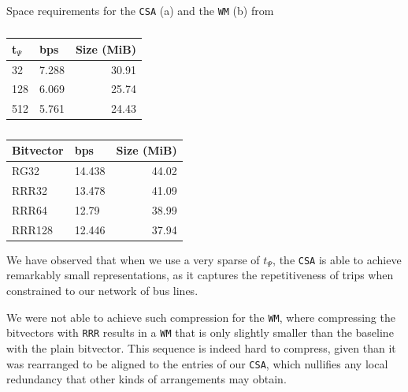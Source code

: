     \begin{table}
        \caption{Space requirements for the \texttt{CSA} (a) and the \texttt{WM} (b) from \ttctr}
        \label{tab:ttctr}
        \begin{subtable}[t]{.30\linewidth}
        \vspace{-12pt}
        \caption{}
        \begin{tabular}[t]{|l|l|r|}
            \hline
            t$_\Psi$ & bps & Size (MiB) \\
             \hline
            32 & 7.288 & 30.91 \\
            128 & 6.069 & 25.74 \\
            512 & 5.761 & 24.43 \\
            \hline
        \end{tabular}
        \end{subtable}%
        \begin{subtable}[t]{.40\linewidth}
        \vspace{-12pt}
        \caption{}
        \begin{tabular}[t]{|l|l|r|}
            \hline
            Bitvector & bps & Size (MiB) \\
             \hline
            RG32 & 14.438 & 44.02 \\
            RRR32 & 13.478 & 41.09 \\
            RRR64 & 12.79 & 38.99 \\
            RRR128 & 12.446 & 37.94 \\
            \hline
        \end{tabular}
        \end{subtable}
    \end{table}
    
    We have observed that when we use a very sparse of $t_\Psi$, the \texttt{CSA} is able to achieve remarkably small representations, as it captures the repetitiveness of trips when constrained to our network of bus lines.
    
    We were not able to achieve such compression for the \texttt{WM}, where compressing the bitvectors with \texttt{RRR} results in a \texttt{WM} that is only slightly smaller than the baseline with the plain bitvector. This sequence is indeed hard to compress, given than it was rearranged to be aligned to the entries of our \texttt{CSA}, which nullifies any local redundancy that other kinds of arrangements may obtain.
    
